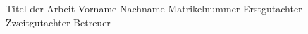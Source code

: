 \iRMBStyle
{Titel der Arbeit}            
{Vorname Nachname}
{Matrikelnummer}
{Erstgutachter}
{Zweitgutachter}
{Betreuer}
